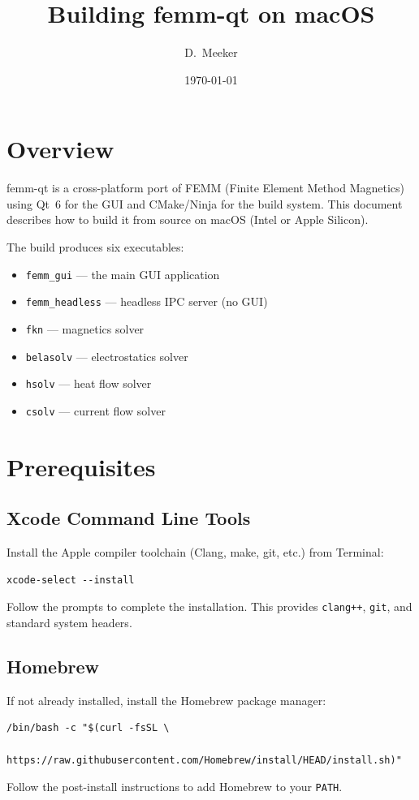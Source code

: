 \documentclass[11pt]{article}
\title{Building femm-qt on macOS}
\author{D.\ Meeker}
\date{\today}
\begin{document}
\maketitle

\section{Overview}

femm-qt is a cross-platform port of FEMM (Finite Element Method Magnetics)
using Qt~6 for the GUI and CMake/Ninja for the build system.  This document
describes how to build it from source on macOS (Intel or Apple Silicon).

The build produces six executables:
\begin{itemize}[nosep]
  \item \texttt{femm\_gui} --- the main GUI application
  \item \texttt{femm\_headless} --- headless IPC server (no GUI)
  \item \texttt{fkn} --- magnetics solver
  \item \texttt{belasolv} --- electrostatics solver
  \item \texttt{hsolv} --- heat flow solver
  \item \texttt{csolv} --- current flow solver
\end{itemize}

\section{Prerequisites}

\subsection{Xcode Command Line Tools}

Install the Apple compiler toolchain (Clang, make, git, etc.) from Terminal:
\begin{lstlisting}
xcode-select --install
\end{lstlisting}
Follow the prompts to complete the installation.  This provides
\texttt{clang++}, \texttt{git}, and standard system headers.

\subsection{Homebrew}

If not already installed, install the Homebrew package manager:
\begin{lstlisting}
/bin/bash -c "$(curl -fsSL \
    https://raw.githubusercontent.com/Homebrew/install/HEAD/install.sh)"
\end{lstlisting}
Follow the post-install instructions to add Homebrew to your \texttt{PATH}.
\end{document}
